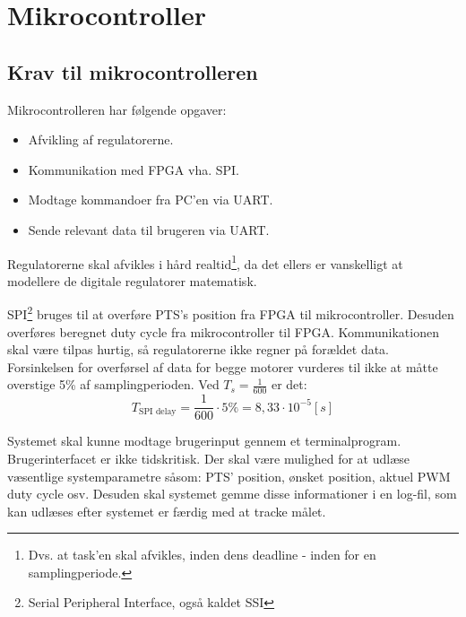 \section{Mikrocontroller}
\label{sec:mikrocontroller}
%
\subsection{Krav til mikrocontrolleren}
Mikrocontrolleren har følgende opgaver: 

\begin{itemize}
\itemsep1pt
	\item Afvikling af regulatorerne.
	\item Kommunikation med FPGA vha. SPI.
	\item Modtage kommandoer fra PC'en via UART.
	\item Sende relevant data til brugeren via UART.
\end{itemize}

Regulatorerne skal afvikles i hård realtid\footnote{Dvs. at task'en skal afvikles, inden dens deadline - inden for en samplingperiode.},
da det ellers er vanskelligt at modellere de digitale regulatorer matematisk.

SPI\footnote{Serial Peripheral Interface, også kaldet SSI} bruges til at overføre PTS's position fra FPGA til mikrocontroller.
Desuden overføres beregnet duty cycle fra mikrocontroller til FPGA.
Kommunikationen skal være tilpas hurtig, så regulatorerne ikke regner på forældet data.
Forsinkelsen for overførsel af data for begge motorer vurderes til ikke at måtte overstige 5\% af samplingperioden.
Ved $T_s = \frac{1}{600}$ er det: 
\begin{equation}
	T_{\text{SPI delay}} = \frac{1}{600} \cdot 5 \% = 8,33 \cdot 10^{-5}[s]
	\label{eq:uc:spi-krav}
\end{equation}

Systemet skal kunne modtage brugerinput gennem et terminalprogram.
Brugerinterfacet er ikke tidskritisk.
Der skal være mulighed for at udlæse væsentlige systemparametre såsom:
PTS' position, ønsket position, aktuel PWM duty cycle osv.
Desuden skal systemet gemme disse informationer i en log-fil,
som kan udlæses efter systemet er færdig med at tracke målet.

